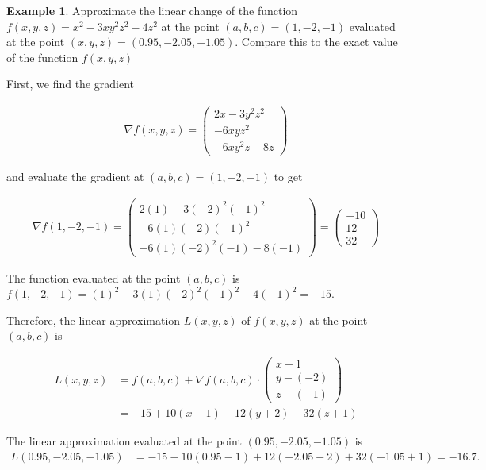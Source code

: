 \documentclass[
]{book}
\theoremstyle{definition}
\theoremstyle{definition}
\newtheorem{example}{Example}[chapter]
\theoremstyle{definition}
\theoremstyle{definition}
\theoremstyle{remark}
\begin{document}
\begin{example}

Approximate the linear change of the function \(f(x, y, z) = x^2 - 3xy^2z^2 - 4z^2\) at the point \((a, b, c) = (1, -2, -1)\) evaluated at the point \((x, y, z) = (0.95, -2.05, -1.05)\). Compare this to the exact value of the function \(f(x, y, z)\)

First, we find the gradient

\[
\begin{aligned}
\nabla f(x, y, z) = \begin{pmatrix} 2x - 3y^2z^2 \\ -6xyz^2 \\ -6xy^2z - 8z \end{pmatrix}
\end{aligned}
\]

and evaluate the gradient at \((a, b, c) = (1, -2, -1)\) to get

\[
\begin{aligned}
\nabla f(1, -2, -1) = \begin{pmatrix} 2(1) - 3(-2)^2(-1)^2 \\ -6(1)(-2)(-1)^2 \\ -6(1)(-2)^2(-1) - 8(-1) \end{pmatrix} = \begin{pmatrix} -10 \\ 12 \\ 32 \end{pmatrix} 
\end{aligned}
\]

The function evaluated at the point \((a, b, c)\) is \(f(1, -2, -1) = (1)^2 - 3(1)(-2)^2(-1)^2 - 4(-1)^2 = -15\).

Therefore, the linear approximation \(L(x, y, z)\) of \(f(x, y, z)\) at the point \((a, b, c)\) is

\[
\begin{aligned}
L(x, y, z) & = f(a, b, c) + \nabla f(a, b, c) \cdot \begin{pmatrix} x - 1 \\ y - (-2) \\ z - (-1) \end{pmatrix} \\
& = -15 + 10(x - 1) - 12 (y + 2) - 32 (z + 1)
\end{aligned}
\]

The linear approximation evaluated at the point \((0.95, -2.05, -1.05)\) is
\[
\begin{aligned}
L(0.95, -2.05, -1.05) & = -15 - 10(0.95 - 1) + 12 (-2.05 + 2) + 32 (-1.05 + 1) = -16.7.
\end{aligned}
\]


\end{example}
\end{document}
